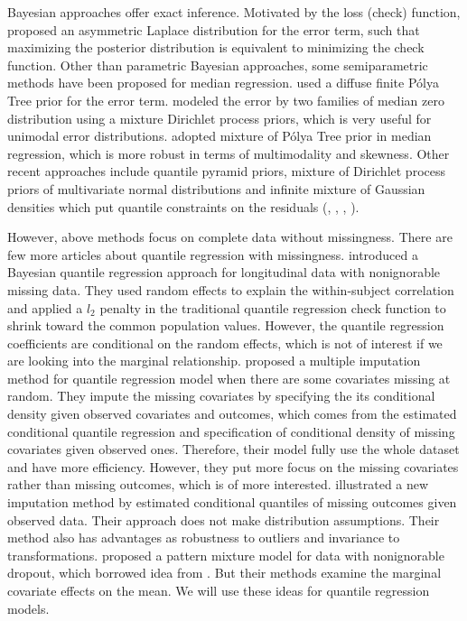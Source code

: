 \documentclass[12pt]{article}
\newcommand{\polya}{P\'{o}lya}
\begin{document}
Bayesian approaches offer exact inference. Motivated by the loss
(check) function, \citep{yu2001} proposed an asymmetric Laplace
distribution for the error term, such that maximizing the posterior
distribution is equivalent to minimizing the check function. Other
than parametric Bayesian approaches, some semiparametric methods have
been proposed for median regression. \citep{walker1999} used a diffuse
finite \polya{} Tree prior for the error term. \citep{kottas2001}
modeled the error by two families of median zero distribution using a
mixture Dirichlet process priors, which is very useful for unimodal
error distributions. \citep{hanson2002} adopted mixture of \polya{}
Tree prior in median regression, which is more robust in terms of
multimodality and skewness. Other recent approaches include quantile
pyramid priors, mixture of Dirichlet process priors of multivariate
normal distributions and infinite mixture of Gaussian densities which
put quantile constraints on the residuals (\citep{hjort2007},
\citep{hjort2009}, \citep{kottas2009}, \citep{reich2010}).

However, above methods focus on complete data without missingness.
There are few more articles about quantile regression with
missingness.  \citep{yuan2010} introduced a Bayesian quantile
regression approach for longitudinal data with nonignorable missing
data. They used random effects to explain the within-subject
correlation and applied a $l_2$ penalty in the traditional quantile
regression check function to shrink toward the common population
values. However, the quantile regression coefficients are conditional
on the random effects, which is not of interest if we are looking into
the marginal relationship.  \citep{wei2012} proposed a multiple
imputation method for quantile regression model when there are some
covariates missing at random. They impute the missing covariates by
specifying the its conditional density given observed covariates and
outcomes, which comes from the estimated conditional quantile
regression and specification of conditional density of missing
covariates given observed ones.  Therefore, their model fully use the
whole dataset and have more efficiency. However, they put more focus
on the missing covariates rather than missing outcomes, which is of
more interested.  \cite{bottai2013} illustrated a new imputation
method by estimated conditional quantiles of missing outcomes given
observed data. Their approach does not make distribution
assumptions. Their method also has advantages as robustness to
outliers and invariance to transformations.  \citep{roy2008} proposed
a pattern mixture model for data with nonignorable dropout, which
borrowed idea from \citep{heagerty1999}.  But their methods examine
the marginal covariate effects on the mean. We will use these ideas
for quantile regression models.
\end{document}
